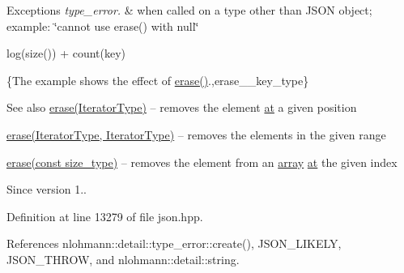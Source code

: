 \begin{DoxyExceptions}{Exceptions}
{\em type\+\_\+error.} & when called on a type other than J\+S\+ON object; example\+: {\ttfamily \char`\"{}cannot use erase() with null\char`\"{}}\\
\hline
\end{DoxyExceptions}
{\ttfamily log(size()) + count(key)}

\{The example shows the effect of {\ttfamily \hyperlink{classnlohmann_1_1basic__json_a068a16e76be178e83da6a192916923ed}{erase()}}.,erase\+\_\+\+\_\+key\+\_\+type\}

\begin{DoxySeeAlso}{See also}
\hyperlink{classnlohmann_1_1basic__json_a068a16e76be178e83da6a192916923ed}{erase(\+Iterator\+Type)} -- removes the element \hyperlink{classnlohmann_1_1basic__json_a73ae333487310e3302135189ce8ff5d8}{at} a given position 

\hyperlink{classnlohmann_1_1basic__json_a4b3f7eb2d4625d95a51fbbdceb7c5f39}{erase(\+Iterator\+Type, Iterator\+Type)} -- removes the elements in the given range 

\hyperlink{classnlohmann_1_1basic__json_a88cbcefe9a3f4d294bed0653550a5cb9}{erase(const size\+\_\+type)} -- removes the element from an \hyperlink{classnlohmann_1_1basic__json_aa80485befaffcadaa39965494e0b4d2e}{array} \hyperlink{classnlohmann_1_1basic__json_a73ae333487310e3302135189ce8ff5d8}{at} the given index
\end{DoxySeeAlso}
\begin{DoxySince}{Since}
version 1.. 
\end{DoxySince}


Definition at line 13279 of file json.\+hpp.



References nlohmann\+::detail\+::type\+\_\+error\+::create(), J\+S\+O\+N\+\_\+\+L\+I\+K\+E\+LY, J\+S\+O\+N\+\_\+\+T\+H\+R\+OW, and nlohmann\+::detail\+::string.


